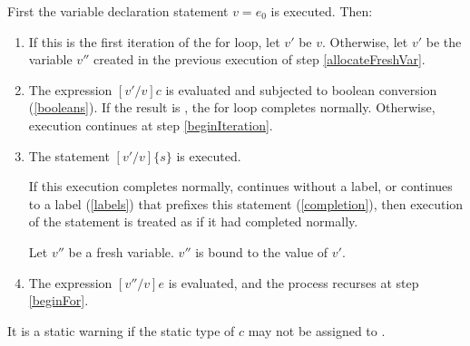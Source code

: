 \documentclass{article}
\begin{document}
\LMHash{}
First the variable declaration statement \VAR{} $v = e_0$ is executed.
Then:
\begin{enumerate}
\item
\label{beginFor}
If this is the first iteration of the for loop, let $v'$ be $v$.
Otherwise, let $v'$ be the variable $v''$ created in the previous execution of step \ref{allocateFreshVar}.
\item
The expression $[v'/v]c$ is evaluated and subjected to boolean conversion (\ref{booleans}).
If the result is \FALSE{}, the for loop completes normally.
Otherwise, execution continues at step \ref{beginIteration}.
\item
\label{beginIteration}
The statement $[v'/v]\{s\}$ is executed.

If this execution completes normally, continues without a label,
or continues to a label (\ref{labels}) that prefixes this \FOR{} statement (\ref{completion}),
then execution of the statement is treated as if it had completed normally.

\label{allocateFreshVar}
Let $v''$ be a fresh variable.
$v''$ is bound to the value of $v'$.
\item
The expression $[v''/v]e$ is evaluated, and the process recurses at step \ref{beginFor}.
\end{enumerate}


\LMHash{}
It is a static warning if the static type of $c$ may not be assigned to .



\end{document}
